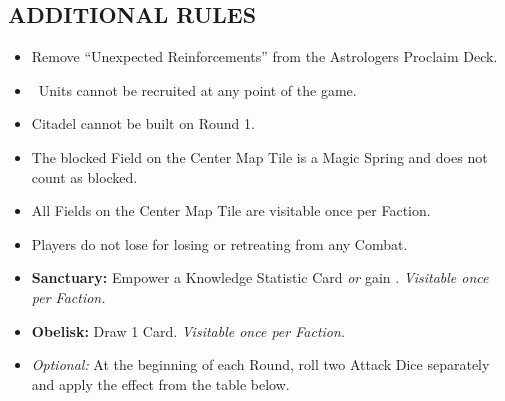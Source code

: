 \begin{multicols*}{2}
\subsection*{\MakeUppercase{Additional Rules}}
\begin{itemize}
  \item Remove ``Unexpected Reinforcements'' from the Astrologers Proclaim Deck.
  \item \azure\ Units cannot be recruited at any point of the game.
  \item Citadel cannot be built on Round 1.
  \item The blocked Field on the Center Map Tile is a Magic Spring and does not count as blocked.
  \item All Fields on the Center Map Tile are visitable once per Faction.
  \item Players do not lose  for losing or retreating from any Combat.
  \item \textbf{Sanctuary:} Empower a Knowledge Statistic Card \textit{or} gain . \textit{Visitable once per Faction.}
  \item \textbf{Obelisk:} Draw 1 Card. \textit{Visitable once per Faction.}
  \item \textit{Optional:} At the beginning of each Round, roll two Attack Dice separately and apply the effect from the table below.
\end{itemize}

\vspace*{\fill}
\end{multicols*}
